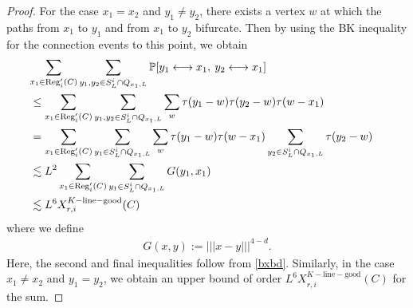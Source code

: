 \documentclass[11pt]{article}
\theoremstyle{definition}
\theoremstyle{remark}
\newcommand{\bP}{\mathbb{P}}
\numberwithin{equation}{section}
\theoremstyle{plain}
\theoremstyle{definition}
\theoremstyle{remark}
\theoremstyle{plain}
\newcommand{\tnorm}[1]{\vert\!\vert\!\vert #1 \vert\!\vert\!\vert}
\begin{document}
\begin{proof}
For the case $x_1=x_2$ and $y_1\neq y_2$, there exists a vertex $w$ at which the paths from $x_1$ to $y_1$ and from $x_1$ to $y_2$ bifurcate. Then by using the BK inequality for the connection events to this point, we obtain
\begin{align}
   \lefteqn{\sum_{x_1\in \mathrm{Reg}_i'(C)}\sum_{y_1,y_2\in S_L^i\cap Q_{x_1,L}}\bP[y_1 \longleftrightarrow x_1,\:y_2 \longleftrightarrow x_1]}\nonumber\\
   &\le \sum_{x_1\in \mathrm{Reg}_i'(C)}\sum_{y_1,y_2\in S_L^i\cap Q_{x_1,L}}\sum_{w}\tau(y_1-w)\tau(y_2-w)\tau(w-x_1)\nonumber\\
   &=\sum_{x_1\in \mathrm{Reg}_i'(C)}\sum_{y_1\in S_L^i\cap Q_{x_1,L}}\sum_{w}\tau(y_1-w)\tau(w-x_1)\sum_{y_2\in S_L^i\cap Q_{x_1,L}}\tau(y_2-w)\nonumber\\
   &\lesssim L^2 \sum_{x_1\in \mathrm{Reg}_i'(C)}\sum_{y_1\in S_L^i\cap Q_{x_1,L}}G(y_1,x_1)\nonumber\\
   &\lesssim L^6X_{r,i}^{K-\mathrm{line-good}}(C)\label{easy2}
\end{align}
where we define
\begin{align*}
G(x,y):=\tnorm{x-y}^{4-d}.
\end{align*}
Here, the second and final inequalities follow from \eqref{bxbd}. Similarly, in the case $x_1\neq x_2$ and $y_1=y_2$, we obtain an upper bound of order $L^6X_{r,i}^{K-\mathrm{line-good}}(C)$ for the sum.


\end{proof}
\end{document}

